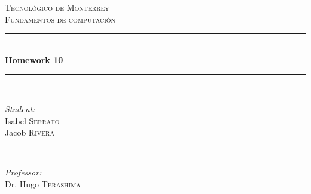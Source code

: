 \documentclass{article}
\begin{document}
\begin{titlepage}

    \newcommand{\HRule}{\rule{\linewidth}{0.5mm}} %

    \center %


    \textsc{\LARGE Tecnológico de Monterrey}\\[1.5cm] %
    \textsc{\Large Fundamentos de computación}\\[0.5cm] %


    \HRule \\[0.4cm]
    { \huge \bfseries Homework 10}\\[0.4cm] %
    \HRule \\[1.5cm]


    \begin{minipage}{0.4\textwidth}
    \begin{flushleft} \large
    \emph{Student:}\\
    Isabel \textsc{Serrato}\\ %
    Jacob \textsc{Rivera}
    \end{flushleft}
    \end{minipage}
    ~
    \begin{minipage}{0.4\textwidth}
    \begin{flushright} \large
    \emph{Professor:} \\
    Dr. Hugo \textsc{Terashima} %
    \end{flushright}
    \end{minipage}\\[2cm]


\end{titlepage}
\end{document}
